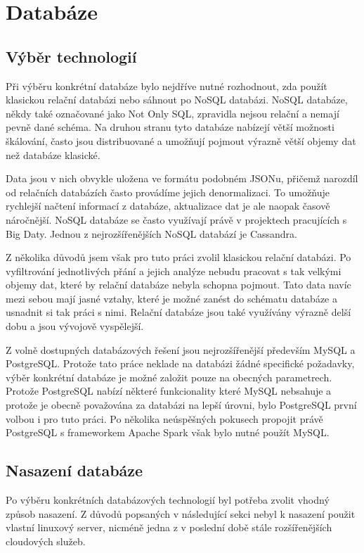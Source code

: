 \documentclass[thesis=B,czech]{FITthesis}[2012/06/26]
\begin{document}
\section{Databáze}
\subsection{Výběr technologií}
	Při výběru konkrétní databáze bylo nejdříve nutné rozhodnout, zda použít klasickou relační databázi nebo sáhnout po NoSQL databázi. NoSQL databáze, někdy také označované jako Not Only SQL, zpravidla nejsou relační a nemají pevně dané schéma. Na druhou stranu tyto databáze nabízejí větší možnosti škálování, často jsou distribuované a umožňují pojmout výrazně větší objemy dat než databáze klasické\cite{nosql-dbs}. 
	
	Data jsou v nich obvykle uložena ve formátu podobném JSONu, přičemž narozdíl od relačních databázích často provádíme jejich denormalizaci. To umožňuje rychlejší načtení informací z databáze, aktualizace dat je ale naopak časově náročnější. NoSQL databáze se často využívají právě v projektech pracujících s Big Daty. Jednou z nejrozšířenějších NoSQL databází je Cassandra. 
	
	Z několika důvodů jsem však pro tuto práci zvolil klasickou relační databázi. Po vyfiltrování jednotlivých přání a jejich analýze nebudu pracovat s tak velkými objemy dat, které by relační databáze nebyla schopna pojmout. Tato data navíc mezi sebou mají jasné vztahy, které je možné zanést do schématu databáze a usnadnit si tak práci s nimi. Relační databáze jsou také využívány výrazně delší dobu a jsou vývojově vyspělejší. 
	
	Z volně dostupných databázových řešení jsou nejrozšířenější především MySQL a PostgreSQL. Protože tato práce neklade na databázi žádné specifické požadavky, výběr konkrétní databáze je možné založit pouze na obecných parametrech. Protože PostgreSQL nabízí některé funkcionality které MySQL nebsahuje a protože je obecně považována za databázi na lepší úrovni\cite{aaaaaaaa}, bylo PostgreSQL první volbou i pro tuto práci. Po několika neúspěšných pokusech propojit právě PostgreSQL s frameworkem Apache Spark však bylo nutné použít MySQL. 
	
\subsection{Nasazení databáze}
	Po výběru konkrétních databázových technologií byl potřeba zvolit vhodný způsob nasazení. Z důvodů popsaných v následující sekci nebyl k nasazení použit vlastní linuxový server, nicméně jedna z v poslední době stále rozšířenějších cloudových služeb. 
	
\end{document}
